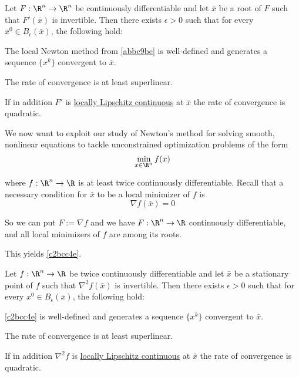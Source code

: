\label{fc03f3f}

Let $F:\R^n\to\R^n$ be continuously differentiable and let $\bar x$ be a root
of $F$ such that $F'(\bar x)$ is invertible. Then there exists $\epsilon>0$
such that for every $x^0\in B_\epsilon(\bar x)$, the following hold:
\begin{enumerata}
  \item The local Newton method from \autoref{abbc9be} is well-defined and
        generates a sequence $\{x^k\}$ convergent to $\bar x$.
  \item The rate of convergence is at least superlinear.
  \item If in addition $F'$ is \href{ba65fa0}{locally Lipschitz continuous} at
        $\bar x$ the rate of convergence is quadratic.
\end{enumerata}

\label{f2a142c}

We now want to exploit our study of Newton's method for solving smooth,
nonlinear equations to tackle unconstrained optimization problems of the form
$$
  \min_{x\in\R^n} f(x)
$$

where $f:\R^n\to\R$ is at least twice continuously differentiable. Recall that
a necessary condition for $\bar x$ to be a local minimizer of $f$ is
$$
  \nabla f(\bar x)=0
$$

So we can put $F:=\nabla f$ and we have $F:\R^n\to\R$ continuously
differentiable, and all local minimizers of $f$ are among its roots.

This yields \autoref{c2bcc4e}.

\label{bf187b2}

Let $f:\R^n\to\R$ be twice continuously differentiable and let $\bar x$ be a
stationary point of $f$ such that $\nabla^2f(\bar x)$ is invertible. Then there
exists $\epsilon>0$ such that for every $x^0\in B_\epsilon(\bar x)$, the
following hold:
\begin{enumerata}
  \item \autoref{c2bcc4e} is well-defined and generates
  a sequence $\{x^k\}$ convergent to $\bar x$.
  \item The rate of convergence is at least superlinear.
  \item If in addition $\nabla^2f$ is \href{ba65fa0}{locally Lipschitz
        continuous} at $\bar x$ the rate of convergence is quadratic.
\end{enumerata}

